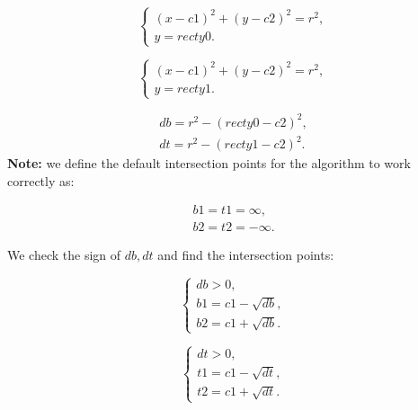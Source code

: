 \documentclass{report}
\begin{document}
\begin{itemize}
	\begin{equation}
		\begin{cases}
			(x - c1)^2 + (y - c2)^2 = r^2,\\ 
			y = recty0.			
		\end{cases}
		\label{eq:sys3}
	\end{equation}
	
	\begin{equation}
		\begin{cases}
			(x - c1)^2 + (y - c2)^2 = r^2,\\ 
			y = recty1.				
		\end{cases}
		\label{eq:sys4}
	\end{equation}
	
	\begin{equation}
		\begin{gathered}
			db = r^2 - (recty0 - c2)^2,\\
			dt = r^2 - (recty1 - c2)^2.
			\label{eq:diskriminant2}
		\end{gathered}
	\end{equation}
	{\bfseries Note:} we define the default intersection points for the algorithm to work correctly as:
	
	\begin{equation}
		\begin{gathered}
			b1 = t1 =  \infty,\\
			b2 = t2 = -\infty.
			\label{eq:btinf}
		\end{gathered}
	\end{equation}
	
	We check the sign of $db, dt$ and find the intersection points:
	
	\begin{equation}
		\begin{cases}
			db > 0,\\ 
			b1 = c1 - \sqrt {db},\\
			b2 = c1 + \sqrt {db}.
			\label{eq:b1b2}
		\end{cases}
	\end{equation}
	
	\begin{equation}
		\begin{cases}
			dt > 0,\\ 
			t1 = c1 - \sqrt {dt},\\
			t2 = c1 + \sqrt {dt}.
			\label{eq:t1t2}
		\end{cases}
	\end{equation}
	

\end{itemize}
\end{document}

